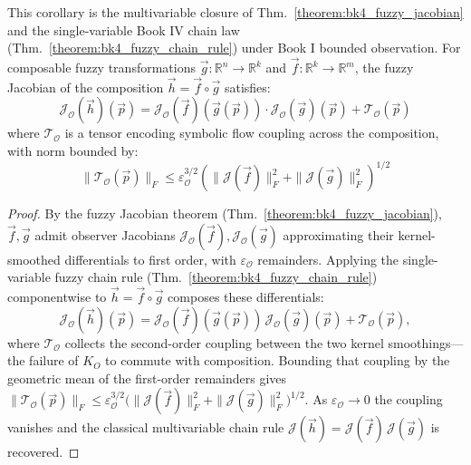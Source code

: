 
\begin{corollary}
\label{corollary:bk4_fuzzy_multivariable_chain}
This corollary is the multivariable closure of Thm.~\ref{theorem:bk4_fuzzy_jacobian} and the single-variable Book IV chain law (Thm.~\ref{theorem:bk4_fuzzy_chain_rule}) under Book I bounded observation.
For composable fuzzy transformations $\vec{g}: \mathbb{R}^n \to \mathbb{R}^k$ and $\vec{f}: \mathbb{R}^k \to \mathbb{R}^m$, the fuzzy Jacobian of the composition $\vec{h} = \vec{f} \circ \vec{g}$ satisfies:
\[
\mathcal{J}_{\mathcal{O}}(\vec{h})(\vec{p}) = \mathcal{J}_{\mathcal{O}}(\vec{f})(\vec{g}(\vec{p})) \cdot \mathcal{J}_{\mathcal{O}}(\vec{g})(\vec{p}) + \mathcal{T}_{\mathcal{O}}(\vec{p})
\]
where $\mathcal{T}_{\mathcal{O}}$ is a tensor encoding symbolic flow coupling across the composition, with norm bounded by:
\[
\|\mathcal{T}_{\mathcal{O}}(\vec{p})\|_F \leq \varepsilon_{\mathcal{O}}^{3/2} \left( \|\mathcal{J}(\vec{f})\|_F^2 + \|\mathcal{J}(\vec{g})\|_F^2 \right)^{1/2}
\]
\end{corollary}

\begin{proof}
\label{proof:bk4_fuzzy_multivariable_chain}
\leavevmode
By the fuzzy Jacobian theorem (Thm.~\ref{theorem:bk4_fuzzy_jacobian}), $\vec{f},\vec{g}$ admit observer Jacobians $\mathcal{J}_{\mathcal{O}}(\vec{f}), \mathcal{J}_{\mathcal{O}}(\vec{g})$ approximating their kernel-smoothed differentials to first order, with $\varepsilon_{\mathcal{O}}$ remainders. Applying the single-variable fuzzy chain rule (Thm.~\ref{theorem:bk4_fuzzy_chain_rule}) componentwise to $\vec{h} = \vec{f}\circ\vec{g}$ composes these differentials:
\[
\mathcal{J}_{\mathcal{O}}(\vec{h})(\vec{p}) = \mathcal{J}_{\mathcal{O}}(\vec{f})(\vec{g}(\vec{p}))\,\mathcal{J}_{\mathcal{O}}(\vec{g})(\vec{p}) + \mathcal{T}_{\mathcal{O}}(\vec{p}),
\]
where $\mathcal{T}_{\mathcal{O}}$ collects the second-order coupling between the two kernel smoothings---the failure of $K_O$ to commute with composition. Bounding that coupling by the geometric mean of the first-order remainders gives $\|\mathcal{T}_{\mathcal{O}}(\vec{p})\|_F \leq \varepsilon_{\mathcal{O}}^{3/2}\bigl(\|\mathcal{J}(\vec{f})\|_F^2 + \|\mathcal{J}(\vec{g})\|_F^2\bigr)^{1/2}$. As $\varepsilon_{\mathcal{O}}\to 0$ the coupling vanishes and the classical multivariable chain rule $\mathcal{J}(\vec{h}) = \mathcal{J}(\vec{f})\,\mathcal{J}(\vec{g})$ is recovered.
\end{proof}

